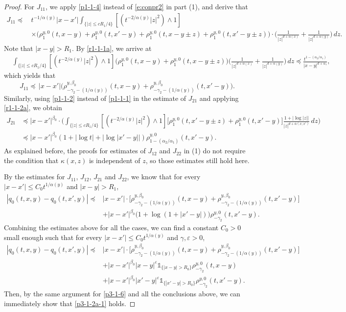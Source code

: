 \documentclass[a4paper,11pt]{amsart}
\renewcommand{\le}{\leqslant}
\newcommand{\B}{\beta}
\newcommand{\I}{\mathds 1}
\newcommand{\p}{\preceq}
\newcommand{\K}{\kappa}
\newcommand{\A}{\alpha}
\newcommand{\G}{\gamma}
\theoremstyle{definition}
\begin{document}
\begin{proof}
For $J_{11}$, we apply \eqref{p1-1-4} instead of \eqref{e:conpr2} in part (1), and derive that
\begin{align*}
J_{11}\p \,&t^{-{1/\A(y)}}|x-x'|\int_{\{|z|\le {cR_1}/{4}\}}
[(t^{-{2}/{\A(y)}} |z|^2)\wedge 1]\\
&\times\Big(
\rho_1^{y,0}(t,x-y)+\rho_1^{y,0}(t,x'-y)+\rho_1^{y,0}(t,x-y\pm z)+\rho_1^{y,0}(t,x'-y\pm z)\Big)\cdot\bigg(\frac{1}{|z|^{d+\A(x)}}
+\frac{1}{|z|^{d+\A(y)}}\bigg)\,dz.
\end{align*}
Note that $|x-y|>R_1$. By \eqref{r1-1-1a}, we arrive at
\begin{align*}
&\int_{\{|z|\le {cR_1}/{4}\}}[(t^{-{2}/{\A(y)}} |z|^2)\wedge 1]
\big(
\rho_1^{y,0}(t,x-y)
+\rho_1^{y,0}(t,x-y\pm z)\big) \bigg(\frac{1}{|z|^{d+\A(x)}}
+\frac{1}{|z|^{d+\A(y)}}\bigg)\,dz\p \frac{t^{1-({\A_2}/{\A_1})}}{|x-y|^{d+\A_1}},
\end{align*}
which yields that
\begin{equation*}
J_{11}\p\, |x-x'|\big(\rho_{-\G_2-({1/\A(y)})}^{y,\B_0}(t,x-y)
+\rho_{-\G_2-({1/\A(y)})}^{y,\B_0}(t,x'-y)\big).
\end{equation*}
Similarly, using \eqref{p1-1-2} instead of \eqref{p1-1-1} in the estimate of $J_{21}$ and applying
\eqref{r1-1-2a}, we obtain
\begin{align*}
J_{21} &\p |x-x'|^{\B_0}\cdot \bigg(
\int_{\{|z|\le {cR_1}/{4}\}}[(t^{-{2}/{\A(y)}} |z|^2)\wedge 1]
\big[\rho^{y,0}_1(t,x'-y\pm z)+\rho^{y,0}_1(t,x'-y)\big]
\frac{1+|\log |z||}{|z|^{d+\overline{\A}(x;x')}}\,dz\bigg)\\
&\p |x-x'|^{\B_0}(1+|\log t|+|\log|x'-y||)\rho_{1-({\A_2}/{\A_1})}^{y,0}(t,x'-y).
\end{align*}
As explained before, the proofs for estimates of $J_{12}$ and
$J_{22}$ in (1) do not require the condition that $\K(x,z)$ is
independent of $z$, so those estimates still hold here.

By the estimates for $J_{11}$, $J_{12}$, $J_{21}$ and $J_{22}$, we know that for
every $|x-x'|\le C_0t^{{1/\A(y)}}$ and $|x-y|>R_1$,
\begin{align*}
|q_0(t,x,y)-q_0(t,x',y)|
 \p& |x-x'|\cdot\big[
\rho^{y,\B_0}_{-\gamma_2-({1/\A(y)})}(t,x-y)
+\rho^{y,\B_0}_{-\gamma_2-({1/\A(y)})}(t,x'-y)\big]\\
&+|x-x'|^{\B_0}\big(1+\log(1+|x'-y|)\big)\rho^{y,0}_{-\gamma_2}(t,x'-y).
\end{align*}
Combining the estimates above for all the cases, we can find a constant $C_0>0$ small enough such that for
every $|x-x'|\le C_0 t^{{1/\A(y)}}$ and
$\gamma,\varepsilon>0$,
\begin{align*}
|q_0(t,x,y)-q_0(t,x',y)|\p& |x-x'|\cdot\big[
\rho^{y,\B_0}_{-\G_2 -({1/\A(y)})}(t,x-y)
+\rho^{y,\B_0}_{-\G_2 -({1/\A(y)})}(t,x'-y)\big]\\
&+|x-x'|^{\B_0}|x-y|^{\varepsilon}\I_{\{|x-y|>R_0\}}\rho^{y,0}_{-\gamma_2}(t,x-y)\\
&+|x-x'|^{\B_0}|x'-y|^{\varepsilon}\I_{\{|x'-y|>R_0\}}\rho^{y,0}_{-\gamma_2}(t,x'-y).
\end{align*}
Then, by the same argument for \eqref{p3-1-6} and all the conclusions above, we can immediately show that \eqref{p3-1-2a-1} holds.
\end{proof}
\end{document}

